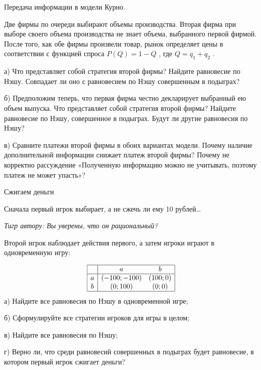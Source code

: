 \begin{problem}
 Передача информации в модели Курно.\par
Две фирмы по очереди выбирают объемы производства. Вторая фирма при выборе своего объема производства не знает объема, выбранного первой фирмой. После того, как обе фирмы произвели товар, рынок определяет цены в соответствии с функцией спроса  $P\left(Q\right)=1-Q$ , где  $Q=q_{1} +q_{2} $ .\par
а) Что представляет собой стратегия второй фирмы? Найдите равновесие по Нэшу. Совпадает ли оно с равновесием по Нэшу совершенным в подыграх?\par
б) Предположим теперь, что первая фирма честно декларирует выбранный ею объем выпуска. Что представляет собой стратегия второй фирмы? Найдите равновесие по Нэшу, совершенное в подыграх. Будут ли другие равновесия по Нэшу?\par
в) Сравните платежи второй фирмы в обоих вариантах модели. Почему наличие дополнительной информации снижает платеж второй фирмы? Почему не корректно рассуждение «Полученную информацию можно не учитывать, поэтому платеж не может упасть»?\par



\begin{sol}

\end{sol}
\end{problem}



\begin{problem}
 Сжигаем деньги\par
Сначала первый игрок выбирает, а не сжечь ли ему 10 рублей\ldots \par
{\it Тигр  автору: Вы уверены, что он рациональный?} \par
Второй игрок наблюдает действия первого, а затем игроки играют в одновременную игру:\par
\[\begin{array}{|c|cc|}  \hline {} & {a} & {b} \\  \hline {a} & {\left(-100;-100\right)} & {\left(100;0\right)} \\ {b} & {\left(0;100\right)} & {\left(0;0\right)} \\  \hline  \end{array}\]
а) Найдите все равновесия по Нэшу в одновременной игре;\par
б) Сформулируйте все стратегии игроков для игры в целом;\par
в) Найдите все равновесия по Нэшу;\par
г) Верно ли, что среди равновесий совершенных в подыграх будет равновесие, в котором первый игрок сжигает деньги?



\begin{sol}

\end{sol}
\end{problem}




